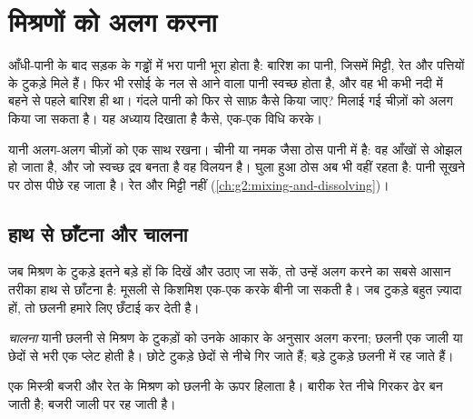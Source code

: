\chapter{मिश्रणों को अलग करना}\label{ch:g3:separating-mixtures}

आँधी-पानी के बाद सड़क के गड्ढों में भरा पानी भूरा होता है: बारिश का
पानी, जिसमें मिट्टी, रेत और पत्तियों के टुकड़े मिले हैं। फिर भी रसोई के
नल से आने वाला पानी स्वच्छ होता है, और वह भी कभी नदी में बहने से पहले
बारिश ही था। गंदले पानी को फिर से साफ़ कैसे किया जाए? मिलाई गई
चीज़ों को अलग किया जा सकता है। यह अध्याय दिखाता है कैसे, एक-एक विधि करके।

\begin{recall}
 यानी अलग-अलग चीज़ों को एक साथ रखना। चीनी या नमक जैसा ठोस पानी
में  है: वह आँखों से ओझल हो जाता है, और जो स्वच्छ द्रव बनता है
वह विलयन है। घुला हुआ ठोस अब भी वहीं रहता है: पानी सूखने पर ठोस पीछे
रह जाता है। रेत और मिट्टी नहीं 
(\cref{ch:g2:mixing-and-dissolving})।
\end{recall}

\section{हाथ से छाँटना और चालना}

जब मिश्रण के टुकड़े इतने बड़े हों कि दिखें और उठाए जा सकें, तो उन्हें
अलग करने का सबसे आसान तरीका हाथ से छाँटना है: मूसली से किशमिश एक-एक करके
बीनी जा सकती है। जब टुकड़े बहुत ज़्यादा हों, तो छलनी हमारे लिए छँटाई
कर देती है।

\begin{definition}[चालना]\label{def:g3:separating-mixtures:sieve}
\emph{चालना} यानी छलनी से मिश्रण के टुकड़ों को उनके
आकार के अनुसार अलग करना; छलनी एक जाली या छेदों से भरी एक प्लेट होती है।
छोटे टुकड़े छेदों से नीचे गिर जाते हैं; बड़े टुकड़े छलनी में रह जाते हैं।
\end{definition}

\begin{example}[बजरी और रेत]\label{ex:g3:separating-mixtures:gravel}
एक मिस्त्री बजरी और रेत के मिश्रण को छलनी के ऊपर हिलाता है। बारीक रेत
नीचे गिरकर ढेर बन जाती है; बजरी जाली पर रह जाती है।
\end{example}

